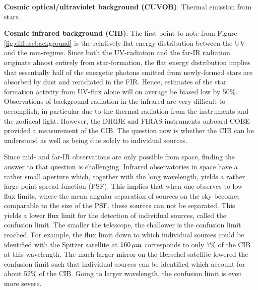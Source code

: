 \documentclass[a4paper,11pt]{article}
\begin{document}
{\noindent}\textbf{Cosmic optical/ultraviolet background (CUVOB)}: Thermal emission from stars.

{\noindent}\textbf{Cosmic infrared background (CIB)}: The first point to note from Figure \ref{fig:diffusebackground} is the relatively flat energy distribution between the UV- and the mm-regime. Since both the UV-radiation and the far-IR radiation originate almost entirely from star-formation, the flat energy distribution implies that essentially half of the energetic photons emitted from newly-formed stars are absorbed by dust and reradiated in the FIR. Hence, estimates of the star formation activity from UV-flux alone will on average be biased low by 50\%. Observations of background radiation in the infrared are very difficult to accomplish, in particular due to the thermal radiation from the instruments and the zodiacal light. However, the DIRBE and FIRAS instruments onboard COBE provided a measurement of the CIB. The question now is whether the CIB can be understood as well as being due solely to individual sources.

{\noindent}Since mid- and far-IR observations are only possible from space, finding the answer to that question is challenging. Infrared observatories in space have a rather small aperture which, together with the long wavelength, yields a rather large point-spread function (PSF). This implies that when one observes to low flux limits, where the mean angular separation of sources on the sky becomes comparable to the size of the PSF, these sources can not be separated. This yields a lower flux limit for the detection of individual sources, called the confusion limit. The smaller the telescope, the shallower is the confusion limit reached. For example, the flux limit down to which individual sources could be identified with the Spitzer satellite at $160\,\mu{\rm m}$ corresponds to only 7\% of the CIB at this wavelength. The much larger mirror on the Herschel satellite lowered the confusion limit such that individual sources can be identified which account for about 52\% of the CIB. Going to larger wavelength, the confusion limit is even more severe.
\end{document}
